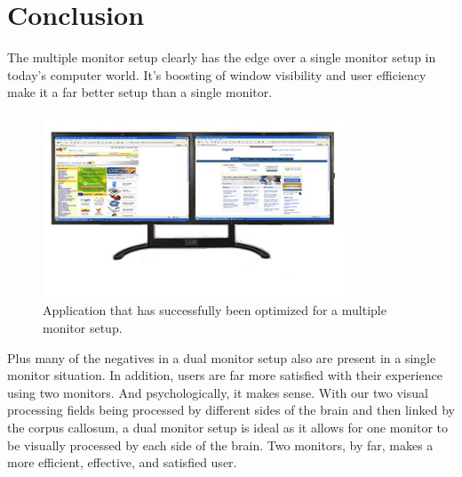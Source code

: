 \documentclass[a4paper]{article}
\begin{document}
\section{Conclusion}
The multiple monitor setup clearly has the edge over a single monitor setup in today's computer world. It's boosting of window visibility and user efficiency make it a far better setup than a single monitor. 
\begin{figure}[H]
\centering
\includegraphics[width=0.8\textwidth]{two-monitors.jpg}
\caption{Application that has successfully been optimized for a multiple monitor setup.}
\end{figure}
Plus many of the negatives in a dual monitor setup also are present in a single monitor situation. In addition, users are far more satisfied with their experience using two monitors. And psychologically, it makes sense. With our two visual processing fields being processed by different sides of the brain and then linked by the corpus callosum, a dual monitor setup is ideal as it allows for one monitor to be visually processed by each side of the brain. Two monitors, by far, makes a more efficient, effective, and satisfied user.



\end{document}
